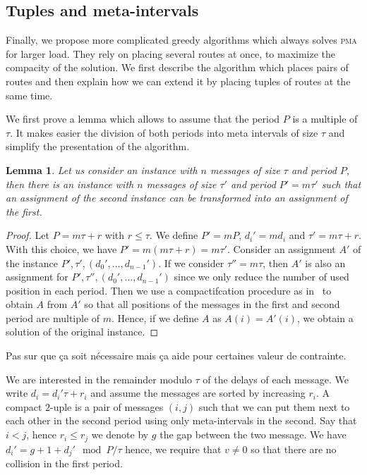 \documentclass[10pt, conference, letterpaper]{IEEEtran}
\newtheorem{lemma}[theorem]{Lemma}
\newcommand\pma{\textsc{pma}\xspace}
\begin{document}
\subsection{Tuples and meta-intervals}

Finally, we propose more complicated greedy algorithms which 
always solves \pma for larger load. They rely on placing several routes at once,
to maximize the compacity of the solution. We first describe the algorithm 
which places pairs of routes and then explain how we can extend it by placing tuples
of routes at the same time.

We first prove a lemma which allows to assume that the period $P$ is a multiple of $\tau$.
It makes easier the division of both periods into meta intervals of size $\tau$ and 
simplify the presentation of the algorithm.

\begin{lemma}
Let us consider an instance with $n$ messages of size $\tau$ and period $P$,
then there is an instance with $n$ messages of size $\tau'$ and period $P'= m\tau'$ such that an assignment of the second instance can be transformed into an assignment of the first.
\end{lemma}
\begin{proof}
Let $P = m \tau + r$ with $r \leq \tau$. We define $P' = mP$, $d_{i}' = m d_i$ 
and $\tau' = m \tau + r$. With this choice, we have $P' = m(m \tau + r) = m \tau'$.
Consider an assignment $A'$ of the instance $P',\tau',(d_{0}',\dots,d_{n-1}')$.
If we consider $\tau'' = m\tau$, then $A'$ is also an assignment for $P',\tau'',(d_{0}',\dots,d_{n-1}')$ since we only reduce the number of used position in each period. 
Then we use a compactifcation procedure as in~\cite{barth2018deterministic} to obtain $A$ from $A'$ so that all positions of the messages in the first and second period
are multiple of $m$. Hence, if we define $A$ as $A(i) = A'(i)$, we obtain a solution of the 
original instance.
\end{proof}
Pas sur que ça soit nécessaire mais ça aide pour certaines valeur de contrainte.

We are interested in the remainder modulo $\tau$ of the delays of each message.
We write $d_i = d_{i}'\tau + r_i$ and assume the messages are sorted by increasing $r_i$.
A compact $2$-uple is a pair of messages $(i,j)$ such that we can put them
next to each other in the second period using only meta-intervals in the second.
Say that $i < j$, hence $r_i \leq r_j$ we denote by $g$ the gap between the two message.
We have $d_{i}' = g + 1 + d_{j}' \mod P/\tau$ hence, we require that $v \neq 0$ so that
there are no collision in the first period. 
\end{document}
